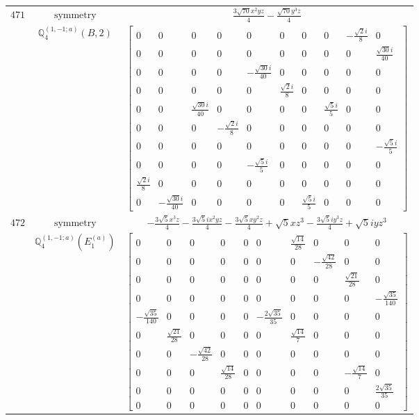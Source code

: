 \documentclass[fleqn,8pt,landscape]{jsarticle}
\begin{document}
\begin{longtable}{ccc}
$ 471 $ & $ \text{symmetry} $ & $ \frac{3 \sqrt{70} x^{2} y z}{4} - \frac{\sqrt{70} y^{3} z}{4} $ \\
$  $ & $ \mathbb{Q}_{4}^{(1,-1;a)}(B,2) $ & $ \begin{bmatrix} 0 & 0 & 0 & 0 & 0 & 0 & 0 & 0 & - \frac{\sqrt{2} i}{8} & 0 \\ 0 & 0 & 0 & 0 & 0 & 0 & 0 & 0 & 0 & \frac{\sqrt{30} i}{40} \\ 0 & 0 & 0 & 0 & - \frac{\sqrt{30} i}{40} & 0 & 0 & 0 & 0 & 0 \\ 0 & 0 & 0 & 0 & 0 & \frac{\sqrt{2} i}{8} & 0 & 0 & 0 & 0 \\ 0 & 0 & \frac{\sqrt{30} i}{40} & 0 & 0 & 0 & 0 & \frac{\sqrt{5} i}{5} & 0 & 0 \\ 0 & 0 & 0 & - \frac{\sqrt{2} i}{8} & 0 & 0 & 0 & 0 & 0 & 0 \\ 0 & 0 & 0 & 0 & 0 & 0 & 0 & 0 & 0 & - \frac{\sqrt{5} i}{5} \\ 0 & 0 & 0 & 0 & - \frac{\sqrt{5} i}{5} & 0 & 0 & 0 & 0 & 0 \\ \frac{\sqrt{2} i}{8} & 0 & 0 & 0 & 0 & 0 & 0 & 0 & 0 & 0 \\ 0 & - \frac{\sqrt{30} i}{40} & 0 & 0 & 0 & 0 & \frac{\sqrt{5} i}{5} & 0 & 0 & 0 \end{bmatrix} $ \\ \hline
$ 472 $ & $ \text{symmetry} $ & $ - \frac{3 \sqrt{5} x^{3} z}{4} - \frac{3 \sqrt{5} i x^{2} y z}{4} - \frac{3 \sqrt{5} x y^{2} z}{4} + \sqrt{5} x z^{3} - \frac{3 \sqrt{5} i y^{3} z}{4} + \sqrt{5} i y z^{3} $ \\
$  $ & $ \mathbb{Q}_{4}^{(1,-1;a)}(E_{1}^{(a)}) $ & $ \begin{bmatrix} 0 & 0 & 0 & 0 & 0 & 0 & \frac{\sqrt{14}}{28} & 0 & 0 & 0 \\ 0 & 0 & 0 & 0 & 0 & 0 & 0 & - \frac{\sqrt{42}}{28} & 0 & 0 \\ 0 & 0 & 0 & 0 & 0 & 0 & 0 & 0 & \frac{\sqrt{21}}{28} & 0 \\ 0 & 0 & 0 & 0 & 0 & 0 & 0 & 0 & 0 & - \frac{\sqrt{35}}{140} \\ - \frac{\sqrt{35}}{140} & 0 & 0 & 0 & 0 & - \frac{2 \sqrt{35}}{35} & 0 & 0 & 0 & 0 \\ 0 & \frac{\sqrt{21}}{28} & 0 & 0 & 0 & 0 & \frac{\sqrt{14}}{7} & 0 & 0 & 0 \\ 0 & 0 & - \frac{\sqrt{42}}{28} & 0 & 0 & 0 & 0 & 0 & 0 & 0 \\ 0 & 0 & 0 & \frac{\sqrt{14}}{28} & 0 & 0 & 0 & 0 & - \frac{\sqrt{14}}{7} & 0 \\ 0 & 0 & 0 & 0 & 0 & 0 & 0 & 0 & 0 & \frac{2 \sqrt{35}}{35} \\ 0 & 0 & 0 & 0 & 0 & 0 & 0 & 0 & 0 & 0 \end{bmatrix} $ \\ \hline

\end{longtable}
\end{document}
